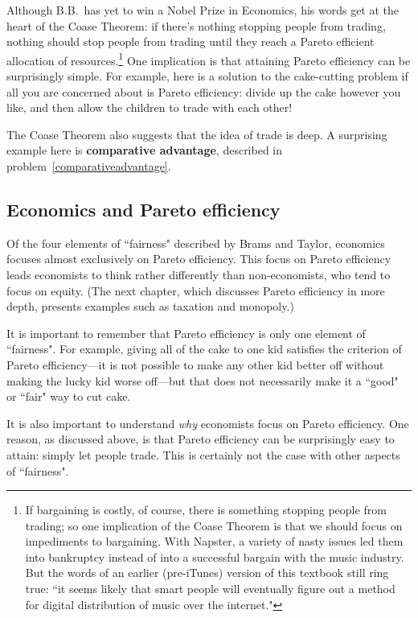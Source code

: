 Although B.B.\ has yet to win a Nobel Prize in Economics, his words get at the heart of the Coase Theorem: if there's nothing stopping people from trading, nothing should stop people from trading until they reach a Pareto efficient allocation of resources.\footnote{If bargaining is costly, of course, there is something stopping people from trading; so one implication of the Coase Theorem is that we should focus on impediments to bargaining. With Napster, a variety of nasty issues led them into bankruptcy instead of into a successful bargain with the music industry. But the words of an earlier (pre-iTunes) version of this textbook still ring true: ``it seems likely that smart people will eventually figure out a method for digital distribution of music over the internet."} One implication is that attaining Pareto efficiency can be surprisingly simple. For example, here is a solution to the cake-cutting problem if all you are concerned about is Pareto efficiency: divide up the cake however you like, and then allow the children to trade with each other!

The Coase Theorem also suggests that the idea of trade is deep. A surprising example here is \textbf{comparative advantage}, described in problem~\ref{comparativeadvantage}.



\subsection*{Economics and Pareto efficiency}

Of the four elements of ``fairness" described by Brams and Taylor,  economics focuses almost exclusively on Pareto efficiency. This focus on Pareto efficiency leads economists to think rather differently than non-economists, who tend to focus on equity. (The next chapter, which discusses Pareto efficiency in more depth, presents examples such as taxation and monopoly.)

It is important to remember that Pareto efficiency is only one element of ``fairness". For example, giving all of the cake to one kid satisfies the criterion of Pareto efficiency---it is not possible to make any other kid better off without making the lucky kid worse off---but that does not necessarily make it a ``good" or ``fair" way to cut cake.

It is also important to understand \emph{why} economists focus on Pareto efficiency. One reason, as discussed above, is that Pareto efficiency can be surprisingly easy to attain: simply let people trade. This is certainly not the case with other aspects of ``fairness".

